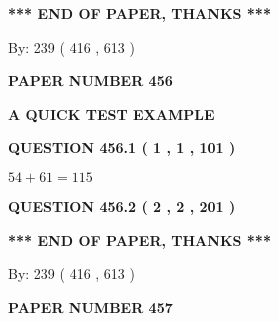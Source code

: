 \documentclass[12pt]{article}
\begin{document}
   
   
   
   
\vspace{1.0in} 
{\textbf{\large{ *** END OF PAPER, THANKS *** }}} 
   
   
\hspace{1.0in} By: 
 239 ( 416 ,  613 )
   
   
   
   
\newpage 
\setcounter{page}{ 
   456001 } 
   
   
   
   
 {\textbf{ \Large{ PAPER NUMBER  456  }}}
   
   
\vspace{0.2in}
   
   
   
   
   
   
 \vspace{0.2in}
{\LARGE {\textbf{ A QUICK TEST EXAMPLE}}}
   
   
  
\vspace{0.2in}
  
{\textbf{\Large{QUESTION
456.1 
 ( 1 , 1 , 101 )
}}}
  
  
 
 

$ %
54 +  %
61=   %
115$
 
 
  
\vspace{0.2in}
  
{\textbf{\Large{QUESTION
456.2 
 ( 2 , 2 , 201 )
}}}
  
  
   
   
 \vspace{0.2in}
 
   
   
   
   
\vspace{1.0in} 
{\textbf{\large{ *** END OF PAPER, THANKS *** }}} 
   
   
\hspace{1.0in} By: 
 239 ( 416 ,  613 )
   
   
   
   
\newpage 
\setcounter{page}{ 
   457001 } 
   
   
   
   
 {\textbf{ \Large{ PAPER NUMBER  457  }}}
   
\end{document}
